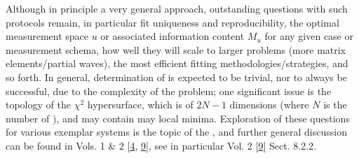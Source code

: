 \documentclass[letterpaper,table,10pt,english]{jupyterBook}
\begin{document}
\sphinxAtStartPar
Although in principle a very general approach, outstanding questions with such protocols remain, in particular fit uniqueness and reproducibility, the optimal measurement space \(u\) \sphinxhyphen{} or associated information content \(M_u\) \sphinxhyphen{} for any given case or measurement schema, how well they will scale to larger problems (more matrix elements/partial waves), the most efficient fitting methodologies/strategies, and so forth. In general, determination of {\hyperref[\detokenize{backmatter/glossary:term-radial-matrix-elements}]{}} is  expected to be trivial, nor to always be successful, due to the complexity of the problem; one significant issue is the topology of the \(\chi^2\) hypersurface, which is of \(2N-1\) dimensions (where \(N\) is the number of {\hyperref[\detokenize{backmatter/glossary:term-radial-matrix-elements}]{}}), and may contain may local minima. Exploration of these questions for various exemplar systems is the topic of the {\hyperref[\detokenize{part2/extracting_matrix_elements_overview_270423:chpt-extracting-matrix-elements-overview}]{}}, and further general discussion can be found in  Vols. 1 \& 2 {[}\hyperlink{cite.backmatter/bibliography:id676}{4}, \hyperlink{cite.backmatter/bibliography:id677}{9}{]}, see in particular  Vol. 2 {[}\hyperlink{cite.backmatter/bibliography:id677}{9}{]} Sect. 8.2.2.
\end{document}
